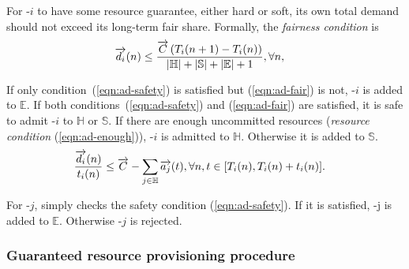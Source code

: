 For \burstq-$i$ to have some resource guarantee, either hard or soft, its own total demand should not exceed its long-term fair share. Formally, the \emph{fairness condition} is 
\begin{align}
	\label{eqn:ad-fair}
    \begin{aligned}
	& \protect\overrightarrow{d_i}(n) \leq \frac{\protect\overrightarrow{C}\left(T_i(n+1)-T_i(n)\right)}{|\mathbb{H}|+|\mathbb{S}|+|\mathbb{E}|+1}, \forall n, 
    \end{aligned}    
\end{align}


If only condition~(\ref{eqn:ad-safety}) is satisfied but (\ref{eqn:ad-fair}) is not, \burstq-$i$ is added to $\mathbb{E}$.
If both conditions~(\ref{eqn:ad-safety}) and (\ref{eqn:ad-fair}) are satisfied, it is safe to admit \burstq-$i$ to $\mathbb{H}$ or $\mathbb{S}$. If there are enough uncommitted resources (\emph{resource condition} (\ref{eqn:ad-enough})), \burstq-$i$ is admitted to $\mathbb{H}$. Otherwise it is added to $\mathbb{S}$.
\begin{align}
	\label{eqn:ad-enough}
    \begin{aligned}
	& \frac{\protect\overrightarrow{d_i}(n)}{t_i(n)} \leq \protect\overrightarrow{C}-\sum_{j\in \mathbb{H}}\protect\overrightarrow{a_j}(t), \forall n, t\in[T_i(n), T_i(n)+t_i(n)].
    \end{aligned}    
\end{align}

%
%

For {\batchq}-$j$, \name simply checks the safety condition (\ref{eqn:ad-safety}). If it is satisfied, {\batchq}-j is added to $\mathbb{E}$. Otherwise {\batchq}-$j$ is rejected.


\subsubsection*{Guaranteed resource provisioning procedure}

